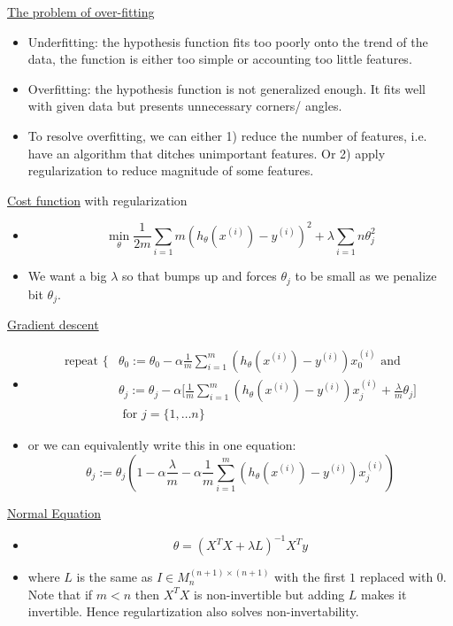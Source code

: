 \documentclass[12pt]{article}
\begin{document}
\underline{The problem of over-fitting}
\begin{itemize}
	\item Underfitting: the hypothesis function fits too poorly onto the trend of the data, the function is either too simple or accounting too little features.
	\item Overfitting: the hypothesis function is not generalized enough. It fits well with given data but presents unnecessary corners/ angles.
	\item To resolve overfitting, we can either 1) reduce the number of features, i.e. have an algorithm that ditches unimportant features. Or 2) apply regularization to reduce magnitude of some features.
\end{itemize}

\underline{Cost function} with regularization
\begin{itemize}
	\item \[\min_\theta \frac{1}{2m}\sum_{i=1}{m} (h_\theta (x^{(i)})-y^{(i)})^2+\lambda\sum_{i=1}{n}\theta_j^2\]
	\item We want a big $\lambda$ so that bumps up and forces $\theta_j$ to be small as we penalize bit $\theta_j$.
	
\end{itemize}

\underline{Gradient descent}

\begin{itemize}
	\item \begin{align*}
\text{repeat } \{ &
\theta_0 := \theta_0 - \alpha\frac{1}{m}\sum_{i=1}^{m} (h_\theta(x^{(i)})-y^{(i)})x_0^{(i)} \text{ and}\\
&\theta_j := \theta_j - \alpha\big[\frac{1}{m}\sum_{i=1}^{m} (h_\theta(x^{(i)})-y^{(i)})x_j^{(i)} + \frac{\lambda}{m}\theta_j\big] \\ 
&\text{ for } j = \{1,\ldots n\}	\end{align*}
	\item or we can equivalently write this in one equation:
	\[\theta_j := \theta_j(1-\alpha\frac{\lambda}{m} - \alpha\frac{1}{m}\sum_{i=1}^{m} (h_\theta(x^{(i)})-y^{(i)})x_j^{(i)} ) \]
\end{itemize}

\underline{Normal Equation}
\begin{itemize}
	\item \[\theta = (X^TX+\lambda L)^{-1} X^Ty\]
	\item where $L$ is the same as $I \in M_n^{(n+1)\times (n+1) }$ 
	with the first $1$ replaced with $0$. Note that if $m<n$ then $X^TX$ is non-invertible but adding $L$ makes it invertible. Hence regulartization also solves non-invertability.	
\end{itemize}
\end{document}
